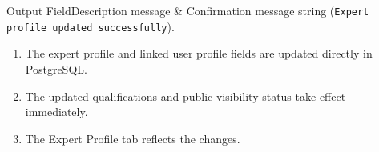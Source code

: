\begin{specdatatable}{Output Field}{Description}
message & Confirmation message string (\texttt{Expert profile updated successfully}).\\ \hline
\end{specdatatable}

\begin{enumerate}[leftmargin=1.6em,topsep=3pt,itemsep=2pt,parsep=0pt]
    \item The expert profile and linked user profile fields are updated directly in PostgreSQL.
    \item The updated qualifications and public visibility status take effect immediately.
    \item The Expert Profile tab reflects the changes.
\end{enumerate}
